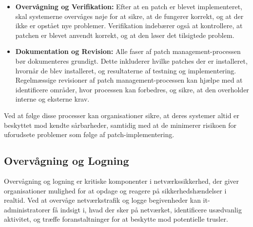 \begin{itemize}
	\item \textbf{Overvågning og Verifikation:} Efter at en patch er blevet implementeret, skal systemerne overvåges nøje for at sikre, at de fungerer korrekt, og at der ikke er opstået nye problemer. Verifikation indebærer også at kontrollere, at patchen er blevet anvendt korrekt, og at den løser det tilsigtede problem.
	
	\item \textbf{Dokumentation og Revision:} Alle faser af patch management-processen bør dokumenteres grundigt. Dette inkluderer hvilke patches der er installeret, hvornår de blev installeret, og resultaterne af testning og implementering. Regelmæssige revisioner af patch management-processen kan hjælpe med at identificere områder, hvor processen kan forbedres, og sikre, at den overholder interne og eksterne krav.
\end{itemize}
\noindent
Ved at følge disse processer kan organisationer sikre, at deres systemer altid er beskyttet mod kendte sårbarheder, samtidig med at de minimerer risikoen for uforudsete problemer som følge af patch-implementering.


\subsection{Overvågning og Logning}
Overvågning og logning er kritiske komponenter i netværkssikkerhed, der giver organisationer mulighed for at opdage og reagere på sikkerhedshændelser i realtid. Ved at overvåge netværkstrafik og logge begivenheder kan it-administratorer få indsigt i, hvad der sker på netværket, identificere usædvanlig aktivitet, og træffe foranstaltninger for at beskytte mod potentielle trusler.

